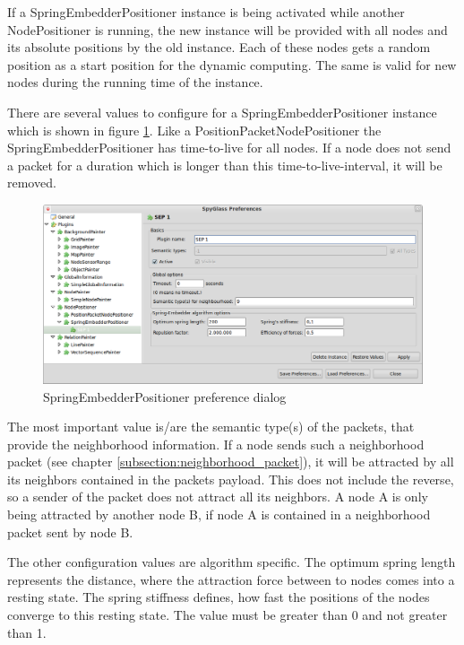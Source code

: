 If a SpringEmbedderPositioner instance is being activated while another NodePositioner is running, the new
instance will be provided with all nodes and its absolute positions by the old instance. Each of these nodes
gets a random position as a start position for the dynamic computing. The same is valid for new nodes during
the running time of the instance.

There are several values to configure for a SpringEmbedderPositioner instance which is shown in figure
\ref{pic:sep_preferences}. Like a PositionPacketNodePositioner
the SpringEmbedderPositioner has time-to-live for all nodes. If a node does not send a packet for a duration
which is longer than this time-to-live-interval, it will be removed.

\begin{figure}[htb]
  \begin{center}
    \includegraphics[width=13.2cm]{./pics/springembedderpositioner_prefpage}
    \caption{SpringEmbedderPositioner preference dialog}
    \label{pic:sep_preferences}
  \end{center}
\end{figure}

The most important value is/are the semantic type(s) of the packets, that provide the neighborhood information.
If a node sends such a neighborhood packet (see chapter \ref{subsection:neighborhood_packet}), it will be
attracted by all its neighbors contained in the packets payload. This does not include the reverse, so a sender of the
packet does not attract all its neighbors. A node A is only being attracted by another node B, if node A is contained
in a neighborhood packet sent by node B.

The other configuration values are algorithm specific. The optimum spring length represents the distance, where the
attraction force between to nodes comes into a resting state. The spring stiffness defines, how fast the positions
of the nodes converge to this resting state. The value must be greater than 0 and not greater than 1.

